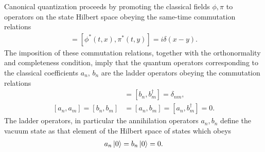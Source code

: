 Canonical quantization proceeds by promoting the classical fields $\phi, \pi$ to operators on the state Hilbert space obeying the same-time commutation relations 
\begin{align}
	[\phi(t, x), \pi(t, y)] = 
	[\phi^*(t, x), \pi^*(t, y)] = i \delta(x-y).
\end{align}
The imposition of these commutation relations, together with the orthonormality and completeness condition, imply that the quantum operators corresponding to the classical coefficients $a_n$, $b_n$ are the ladder operators obeying the commutation relations
\begin{align}
	[a_n, a_m^\dagger] &= [b_n, b_m^\dagger]= \delta_{nm}, \\
	[a_n, a_m] = [b_n, b_m]&= 
	[a_n, b_m] = [a_n, b^\dagger_m]=  0.
\end{align}
The ladder operators, in particular the annihilation operators $a_n, b_n $ define the vacuum state as that element of the Hilbert space of states which obeys 
\begin{align}
	a_n \ket{0} = b_n \ket{0} = 0.
\end{align}
%
%

